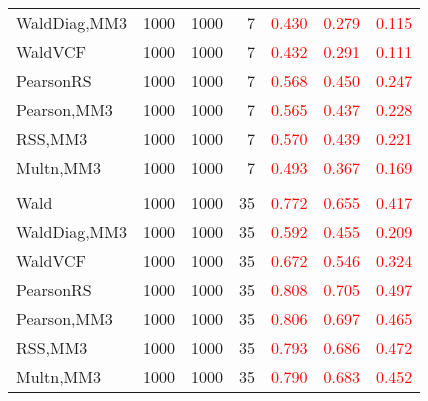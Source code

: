 \documentclass[
]{article}
\begin{document}
\begin{table}[H]
{\begin{tabular}[t]{lrrrrrr}
\hspace{1em}WaldDiag,MM3 & 1000 & 1000 & 7 & \textcolor{red}{0.430} & \textcolor{red}{0.279} & \textcolor{red}{0.115}\\
\hspace{1em}WaldVCF & 1000 & 1000 & 7 & \textcolor{red}{0.432} & \textcolor{red}{0.291} & \textcolor{red}{0.111}\\
\hspace{1em}PearsonRS & 1000 & 1000 & 7 & \textcolor{red}{0.568} & \textcolor{red}{0.450} & \textcolor{red}{0.247}\\
\hspace{1em}Pearson,MM3 & 1000 & 1000 & 7 & \textcolor{red}{0.565} & \textcolor{red}{0.437} & \textcolor{red}{0.228}\\
\hspace{1em}RSS,MM3 & 1000 & 1000 & 7 & \textcolor{red}{0.570} & \textcolor{red}{0.439} & \textcolor{red}{0.221}\\
\hspace{1em}Multn,MM3 & 1000 & 1000 & 7 & \textcolor{red}{0.493} & \textcolor{red}{0.367} & \textcolor{red}{0.169}\\
\addlinespace[0.3em]
\multicolumn{7}{l}{\textbf{3F 15V}}\\
\hspace{1em}Wald & 1000 & 1000 & 35 & \textcolor{red}{0.772} & \textcolor{red}{0.655} & \textcolor{red}{0.417}\\
\hspace{1em}WaldDiag,MM3 & 1000 & 1000 & 35 & \textcolor{red}{0.592} & \textcolor{red}{0.455} & \textcolor{red}{0.209}\\
\hspace{1em}WaldVCF & 1000 & 1000 & 35 & \textcolor{red}{0.672} & \textcolor{red}{0.546} & \textcolor{red}{0.324}\\
\hspace{1em}PearsonRS & 1000 & 1000 & 35 & \textcolor{red}{0.808} & \textcolor{red}{0.705} & \textcolor{red}{0.497}\\
\hspace{1em}Pearson,MM3 & 1000 & 1000 & 35 & \textcolor{red}{0.806} & \textcolor{red}{0.697} & \textcolor{red}{0.465}\\
\hspace{1em}RSS,MM3 & 1000 & 1000 & 35 & \textcolor{red}{0.793} & \textcolor{red}{0.686} & \textcolor{red}{0.472}\\
\hspace{1em}Multn,MM3 & 1000 & 1000 & 35 & \textcolor{red}{0.790} & \textcolor{red}{0.683} & \textcolor{red}{0.452}\\
\bottomrule
\end{tabular}}
\endgroup{}
\end{table}
\end{document}
